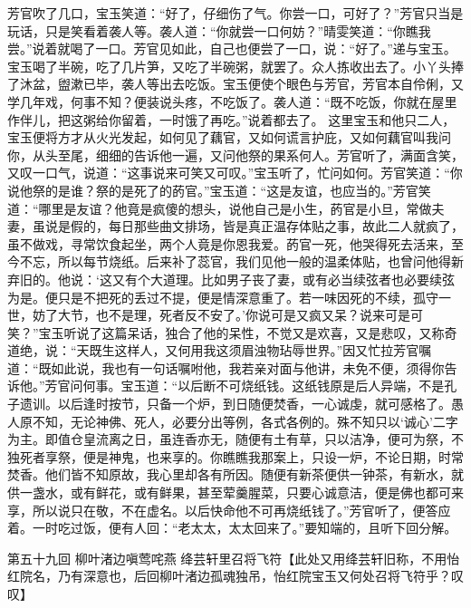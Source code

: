 \documentclass[12pt,oneside]{book}
\begin{document}
芳官吹了几口，宝玉笑道：“好了，仔细伤了气。你尝一口，可好了？”芳官只当是玩话，只是笑看着袭人等。袭人道：“你就尝一口何妨？”晴雯笑道：“你瞧我尝。”说着就喝了一口。芳官见如此，自己也便尝了一口，说：“好了。”递与宝玉。宝玉喝了半碗，吃了几片笋，又吃了半碗粥，就罢了。众人拣收出去了。小丫头捧了沐盆，盥漱已毕，袭人等出去吃饭。宝玉便使个眼色与芳官，芳官本自伶俐，又学几年戏，何事不知？便装说头疼，不吃饭了。袭人道：“既不吃饭，你就在屋里作伴儿，把这粥给你留着，一时饿了再吃。”说着都去了。
这里宝玉和他只二人，宝玉便将方才从火光发起，如何见了藕官，又如何谎言护庇，又如何藕官叫我问你，从头至尾，细细的告诉他一遍，又问他祭的果系何人。芳官听了，满面含笑，又叹一口气，说道：“这事说来可笑又可叹。”宝玉听了，忙问如何。芳官笑道：“你说他祭的是谁？祭的是死了的菂官。”宝玉道：“这是友谊，也应当的。”芳官笑道：“哪里是友谊？他竟是疯傻的想头，说他自己是小生，菂官是小旦，常做夫妻，虽说是假的，每日那些曲文排场，皆是真正温存体贴之事，故此二人就疯了，虽不做戏，寻常饮食起坐，两个人竟是你恩我爱。菂官一死，他哭得死去活来，至今不忘，所以每节烧纸。后来补了蕊官，我们见他一般的温柔体贴，也曾问他得新弃旧的。他说：‘这又有个大道理。比如男子丧了妻，或有必当续弦者也必要续弦为是。便只是不把死的丢过不提，便是情深意重了。若一味因死的不续，孤守一世，妨了大节，也不是理，死者反不安了。’你说可是又疯又呆？说来可是可笑？”宝玉听说了这篇呆话，独合了他的呆性，不觉又是欢喜，又是悲叹，又称奇道绝，说：“天既生这样人，又何用我这须眉浊物玷辱世界。”因又忙拉芳官嘱道：“既如此说，我也有一句话嘱咐他，我若亲对面与他讲，未免不便，须得你告诉他。”芳官问何事。宝玉道：“以后断不可烧纸钱。这纸钱原是后人异端，不是孔子遗训。以后逢时按节，只备一个炉，到日随便焚香，一心诚虔，就可感格了。愚人原不知，无论神佛、死人，必要分出等例，各式各例的。殊不知只以‘诚心’二字为主。即值仓皇流离之日，虽连香亦无，随便有土有草，只以洁净，便可为祭，不独死者享祭，便是神鬼，也来享的。你瞧瞧我那案上，只设一炉，不论日期，时常焚香。他们皆不知原故，我心里却各有所因。随便有新茶便供一钟茶，有新水，就供一盏水，或有鲜花，或有鲜果，甚至荤羹腥菜，只要心诚意洁，便是佛也都可来享，所以说只在敬，不在虚名。以后快命他不可再烧纸钱了。”芳官听了，便答应着。一时吃过饭，便有人回：“老太太，太太回来了。”要知端的，且听下回分解。





 
第五十九回  柳叶渚边嗔莺咤燕  
绛芸轩里召将飞符【此处又用绛芸轩旧称，不用怡红院名，乃有深意也，后回柳叶渚边孤魂独吊，怡红院宝玉又何处召将飞符乎？叹叹】
\end{document}
